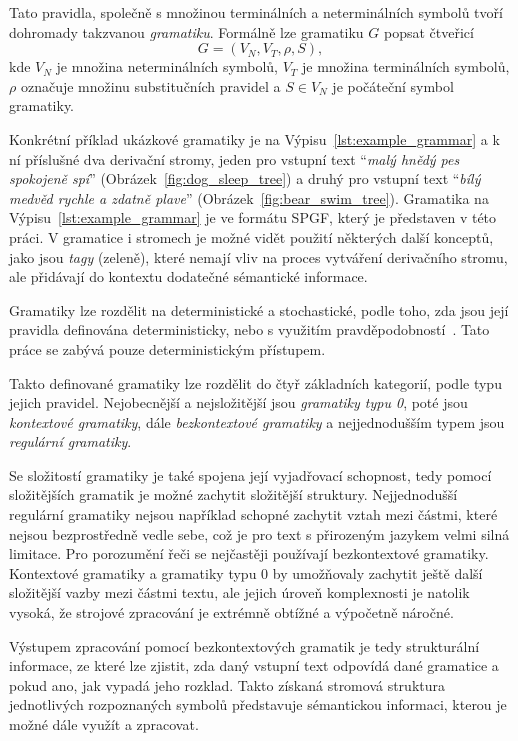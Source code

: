 Tato pravidla, společně s množinou terminálních a neterminálních symbolů tvoří dohromady takzvanou \emph{gramatiku}.
Formálně lze gramatiku $G$ popsat čtveřicí
\[
	G = (V_{N}, V_{T}, \rho, S),
\]
kde $V_{N}$ je množina neterminálních symbolů, $V_{T}$ je množina terminálních symbolů,
$\rho$ označuje množinu substitučních pravidel a $S \in V_{N}$ je počáteční symbol gramatiky.~\cite{PsutkaJ_2006_Mluvimes}

Konkrétní příklad ukázkové gramatiky je na Výpisu~\ref{lst:example_grammar} a k ní příslušné dva derivační stromy,
jeden pro vstupní text \enquote{\emph{malý hnědý pes spokojeně spí}} (Obrázek~\ref{fig:dog_sleep_tree})
a druhý pro vstupní text \enquote{\emph{bílý medvěd rychle a zdatně plave}} (Obrázek~\ref{fig:bear_swim_tree}).
Gramatika na Výpisu~\ref{lst:example_grammar} je ve formátu SPGF, který je představen v této práci.
V gramatice i stromech je možné vidět použití některých další konceptů, jako jsou \emph{tagy} (zeleně), které nemají vliv na proces
vytváření derivačního stromu, ale přidávají do kontextu dodatečné sémantické informace.



Gramatiky lze rozdělit na deterministické a stochastické, podle toho, zda jsou její pravidla definována deterministicky,
nebo s využitím pravděpodobností~\cite{PsutkaJ_2006_Mluvimes}.
Tato práce se zabývá pouze deterministickým přístupem.

Takto definované gramatiky lze rozdělit do čtyř základních kategorií, podle typu jejich pravidel.
Nejobecnější a nejsložitější jsou \emph{gramatiky typu 0}, poté jsou \emph{kontextové gramatiky},
dále \emph{bezkontextové gramatiky} a nejjednodušším typem jsou \emph{regulární gramatiky}.

Se složitostí gramatiky je také spojena její vyjadřovací schopnost, tedy pomocí složitějších gramatik je možné zachytit složitější struktury.
Nejjednodušší regulární gramatiky nejsou například schopné zachytit vztah mezi částmi, které nejsou bezprostředně vedle
sebe, což je pro text s přirozeným jazykem velmi silná limitace.
Pro porozumění řeči se nejčastěji používají bezkontextové gramatiky.
Kontextové gramatiky a gramatiky typu 0 by umožňovaly zachytit ještě další složitější vazby mezi částmi
textu, ale jejich úroveň komplexnosti je natolik vysoká,
že strojové zpracování je extrémně obtížné a výpočetně náročné.~\cite{PsutkaJ_2006_Mluvimes}

Výstupem zpracování pomocí bezkontextových gramatik je tedy strukturální informace, ze které lze zjistit,
zda daný vstupní text odpovídá dané gramatice a pokud ano, jak vypadá jeho rozklad.
Takto získaná stromová struktura jednotlivých rozpoznaných symbolů představuje sémantickou informaci,
kterou je možné dále využít a zpracovat.
